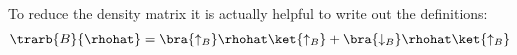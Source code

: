 To reduce the density matrix it is actually helpful to write out the definitions:
\begin{align}
\trarb{B}{\rhohat} = \bra{\uparrow_B}\rhohat\ket{\uparrow_B}+\bra{\downarrow_B}\rhohat\ket{\uparrow_B}
\end{align}